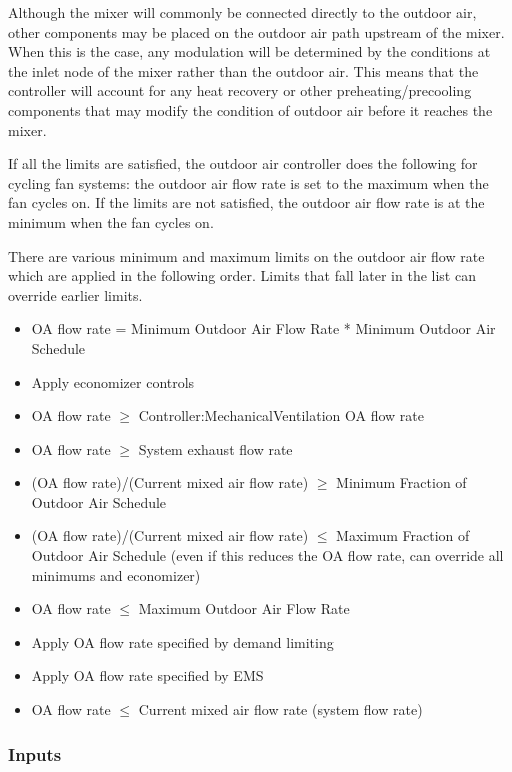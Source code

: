 Although the mixer will commonly be connected directly to the outdoor air, other components may be placed on the outdoor air path upstream of the mixer. When this is the case, any modulation will be determined by the conditions at the inlet node of the mixer rather than the outdoor air. This means that the controller will account for any heat recovery or other preheating/precooling components that may modify the condition of outdoor air before it reaches the mixer.

If all the limits are satisfied, the outdoor air controller does the following for cycling fan systems: the outdoor air flow rate is set to the maximum when the fan cycles on. If the limits are not satisfied, the outdoor air flow rate is at the minimum when the fan cycles on.

There are various minimum and maximum limits on the outdoor air flow rate which are applied in the following order. Limits that fall later in the list can override earlier limits.

\begin{itemize}
\tightlist
\item  OA flow rate = Minimum Outdoor Air Flow Rate * Minimum Outdoor Air Schedule
\item  Apply economizer controls
\item  OA flow rate \(\ge\) Controller:MechanicalVentilation OA flow rate
\item  OA flow rate \(\ge\) System exhaust flow rate
\item  (OA flow rate)/(Current mixed air flow rate) \(\ge\) Minimum Fraction of Outdoor Air Schedule
\item  (OA flow rate)/(Current mixed air flow rate) \(\le\) Maximum Fraction of Outdoor Air Schedule (even if this reduces the OA flow rate, can override all minimums and economizer)
\item  OA flow rate \(\le\) Maximum Outdoor Air Flow Rate
\item  Apply OA flow rate specified by demand limiting
\item  Apply OA flow rate specified by EMS
\item  OA flow rate \(\le\) Current mixed air flow rate (system flow rate)
\end{itemize}

\subsubsection{Inputs}\label{inputs-1-007}

